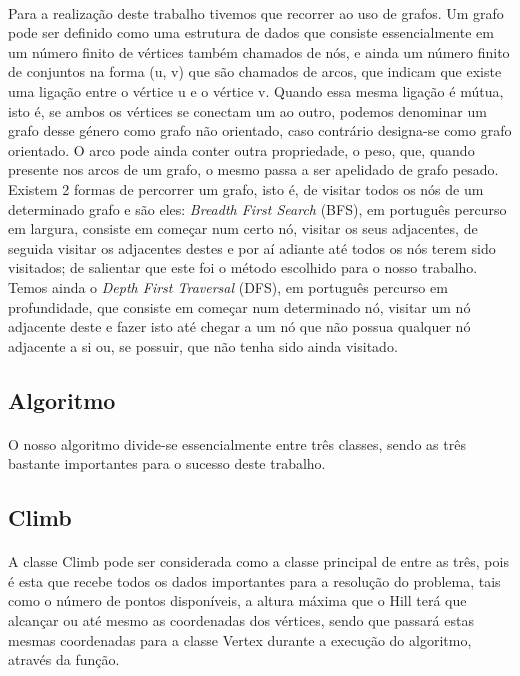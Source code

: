 \documentclass[12pt]{article}
\begin{document}
\paragraph{} 
Para a realização deste trabalho tivemos que recorrer ao uso de grafos. Um grafo pode ser definido como uma estrutura de dados que consiste essencialmente em um número finito de vértices também chamados de nós, e ainda um número finito de conjuntos na forma (u, v) que são chamados de arcos, que indicam que existe uma ligação entre o vértice u e o vértice v. Quando essa mesma ligação é mútua, isto é, se ambos os vértices se conectam um ao outro, podemos denominar um grafo desse género como grafo não orientado, caso contrário designa-se como grafo orientado. O arco pode ainda conter outra propriedade, o peso, que, quando presente nos arcos de um grafo, o mesmo passa a ser apelidado de grafo pesado.
Existem 2 formas de percorrer um grafo, isto é, de visitar todos os nós de um determinado grafo e são eles: \textit{Breadth First Search} (BFS), em português percurso em largura, consiste em começar num certo nó, visitar os seus adjacentes, de seguida visitar os adjacentes destes e por aí adiante até todos os nós terem sido visitados; de salientar que este foi o método escolhido para o nosso trabalho. Temos ainda o \textit{Depth First Traversal} (DFS), em português percurso em profundidade, que consiste em começar num determinado nó, visitar um nó adjacente deste e fazer isto até chegar a um nó que não possua qualquer nó adjacente a si ou, se possuir, que não tenha sido ainda visitado. 
\newpage
\begin{center}
\section{Algoritmo}
\end{center}
\paragraph{}
O nosso algoritmo divide-se essencialmente entre três classes, sendo as três bastante importantes para o sucesso deste trabalho.
\subsection{Climb}
\paragraph{}
A classe Climb pode ser considerada como a classe principal de entre as três, pois é esta que recebe todos os dados importantes para a resolução do problema, tais como o número de pontos disponíveis, a altura máxima que o Hill terá que alcançar ou até mesmo as coordenadas dos vértices, sendo que passará estas mesmas coordenadas para a classe Vertex durante a execução do algoritmo, através da função. 
\end{document}
